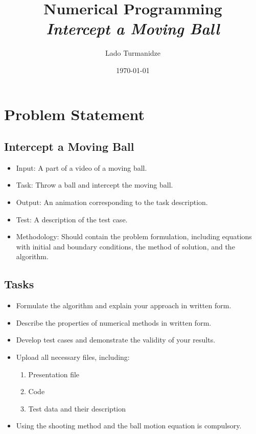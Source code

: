 \documentclass{article}
\begin{document}
	
	
	\title{\textbf{Numerical Programming} \\ \textit{Intercept a Moving Ball}}
	\author{Lado \Bat \space Turmanidze}
	\date{\today}
	
	\maketitle
	
	
	\section*{Problem Statement}
	
	
	\subsection*{Intercept a Moving Ball \Football}
	
	\begin{itemize}
		\item[\ding{101}] Input: A part of a video of a moving ball.
		\item[\ding{101}] Task: Throw a ball and intercept the moving ball.
		\item[\ding{101}] Output: An animation corresponding to the task description.
		\item[\ding{101}] Test: A description of the test case.
		\item[\ding{101}] Methodology: Should contain the problem formulation, including equations with initial and boundary conditions, the method of solution, and the algorithm.
	\end{itemize}
	
	
	\subsection*{Tasks}
	
	\begin{itemize}
		\item[\ding{100}] Formulate the algorithm and explain your approach in written form.
		\item[\ding{100}] Describe the properties of numerical methods in written form.
		\item[\ding{100}] Develop test cases and demonstrate the validity of your results.
		\item[\ding{100}] Upload all necessary files, including: 
		\begin{enumerate} 
			\item Presentation file 
			\item Code 
			\item Test data and their description 
		\end{enumerate}
		\item[\ding{100}] Using the shooting method and the ball motion equation is compulsory.
	\end{itemize}
\end{document}

